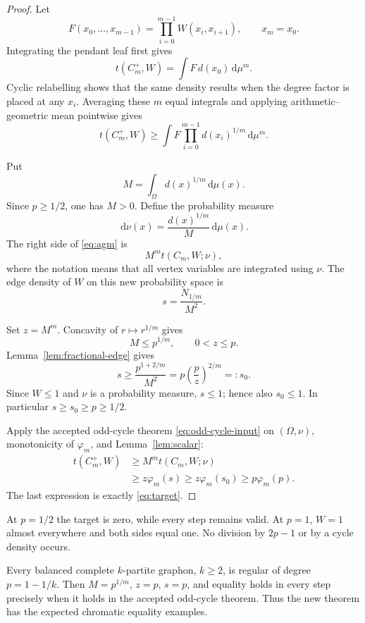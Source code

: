 \documentclass[11pt]{article}
\newcommand{\dd}{\,\mathrm d}
\begin{document}
\begin{proof}
Let
\[
 F(x_0,\ldots,x_{m-1})
 =\prod_{i=0}^{m-1}W(x_i,x_{i+1}),
 \qquad x_m=x_0.
\]
Integrating the pendant leaf first gives
\[
 t(C_m^+,W)=\int F\,d(x_0)\dd\mu^m.
\]
Cyclic relabelling shows that the same density results when the degree
factor is placed at any $x_i$.  Averaging these $m$ equal integrals and
applying arithmetic--geometric mean pointwise gives
\begin{equation}
 t(C_m^+,W)
 \geq\int F\prod_{i=0}^{m-1}d(x_i)^{1/m}\dd\mu^m.
 \label{eq:agm}
\end{equation}

Put
\[
 M=\int_\Omega d(x)^{1/m}\dd\mu(x).
\]
Since $p\geq1/2$, one has $M>0$.  Define the probability measure
\[
 \dd\nu(x)=\frac{d(x)^{1/m}}M\dd\mu(x).
\]
The right side of \eqref{eq:agm} is
\begin{equation}
 M^m t(C_m,W;\nu),
 \label{eq:measure-change}
\end{equation}
where the notation means that all vertex variables are integrated using
$\nu$.  The edge density of $W$ on this new probability space is
\[
 s=\frac{N_{1/m}}{M^2}.
\]

Set $z=M^m$.  Concavity of $r\mapsto r^{1/m}$ gives
\[
 M\leq p^{1/m},
 \qquad 0<z\leq p.
\]
Lemma~\ref{lem:fractional-edge} gives
\[
 s\geq\frac{p^{1+2/m}}{M^2}
 =p\left(\frac pz\right)^{2/m}=:s_0.
\]
Since $W\leq1$ and $\nu$ is a probability measure, $s\leq1$; hence also
$s_0\leq1$.  In particular $s\geq s_0\geq p\geq1/2$.

Apply the accepted odd-cycle theorem \eqref{eq:odd-cycle-input} on
$(\Omega,\nu)$, monotonicity of $\varphi_m$, and
Lemma~\ref{lem:scalar}:
\begin{align*}
 t(C_m^+,W)
 &\geq M^m t(C_m,W;\nu)\\
 &\geq z\varphi_m(s)
 \geq z\varphi_m(s_0)
 \geq p\varphi_m(p).
\end{align*}
The last expression is exactly \eqref{eq:target}.
\end{proof}

At $p=1/2$ the target is zero, while every step remains valid.  At $p=1$,
$W=1$ almost everywhere and both sides equal one.  No division by
$2p-1$ or by a cycle density occurs.

Every balanced complete $k$-partite graphon, $k\geq2$, is regular of degree
$p=1-1/k$.  Then $M=p^{1/m}$, $z=p$, $s=p$, and equality holds in every
step precisely when it holds in the accepted odd-cycle theorem.  Thus the
new theorem has the expected chromatic equality examples.
\end{document}
